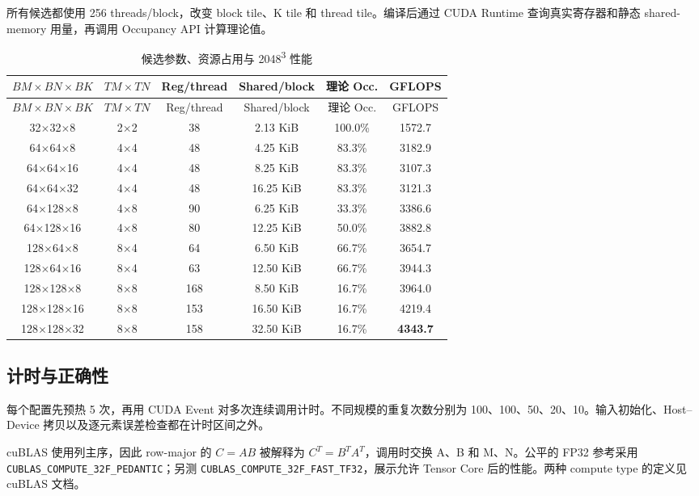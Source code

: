 \documentclass[UTF8,11pt,a4paper,fontset=fandol]{ctexart}
\newcommand{\code}[1]{\nolinkurl{#1}}
\begin{document}
所有候选都使用 256 threads/block，改变 block tile、K tile 和 thread tile。编译后通过 CUDA Runtime 查询真实寄存器和静态 shared-memory 用量，再调用 Occupancy API 计算理论值。

\begin{longtable}{cccccc}
\caption{候选参数、资源占用与 2048\textsuperscript{3} 性能}\label{tab:candidates}\\
\toprule
$BM\times BN\times BK$ & $TM\times TN$ & Reg/thread & Shared/block & 理论 Occ. & GFLOPS \\
\midrule
\endfirsthead
\toprule
$BM\times BN\times BK$ & $TM\times TN$ & Reg/thread & Shared/block & 理论 Occ. & GFLOPS \\
\midrule
\endhead
32$\times$32$\times$8   & 2$\times$2 & 38  & 2.13 KiB  & 100.0\% & 1572.7 \\
64$\times$64$\times$8   & 4$\times$4 & 48  & 4.25 KiB  & 83.3\%  & 3182.9 \\
64$\times$64$\times$16  & 4$\times$4 & 48  & 8.25 KiB  & 83.3\%  & 3107.3 \\
64$\times$64$\times$32  & 4$\times$4 & 48  & 16.25 KiB & 83.3\%  & 3121.3 \\
64$\times$128$\times$8  & 4$\times$8 & 90  & 6.25 KiB  & 33.3\%  & 3386.6 \\
64$\times$128$\times$16 & 4$\times$8 & 80  & 12.25 KiB & 50.0\%  & 3882.8 \\
128$\times$64$\times$8  & 8$\times$4 & 64  & 6.50 KiB  & 66.7\%  & 3654.7 \\
128$\times$64$\times$16 & 8$\times$4 & 63  & 12.50 KiB & 66.7\%  & 3944.3 \\
128$\times$128$\times$8 & 8$\times$8 & 168 & 8.50 KiB  & 16.7\%  & 3964.0 \\
128$\times$128$\times$16& 8$\times$8 & 153 & 16.50 KiB & 16.7\%  & 4219.4 \\
\rowcolor{LightGreen}
128$\times$128$\times$32& 8$\times$8 & 158 & 32.50 KiB & 16.7\%  & \textbf{4343.7} \\
\bottomrule
\end{longtable}

\subsection{计时与正确性}

每个配置先预热 5 次，再用 CUDA Event 对多次连续调用计时。不同规模的重复次数分别为 100、100、50、20、10。输入初始化、Host--Device 拷贝以及逐元素误差检查都在计时区间之外。

cuBLAS 使用列主序，因此 row-major 的 $C=AB$ 被解释为 $C^T=B^TA^T$，调用时交换 A、B 和 M、N。公平的 FP32 参考采用 \code{CUBLAS_COMPUTE_32F_PEDANTIC}；另测 \code{CUBLAS_COMPUTE_32F_FAST_TF32}，展示允许 Tensor Core 后的性能。两种 compute type 的定义见 cuBLAS 文档\cite{cublas-doc}。
\end{document}
